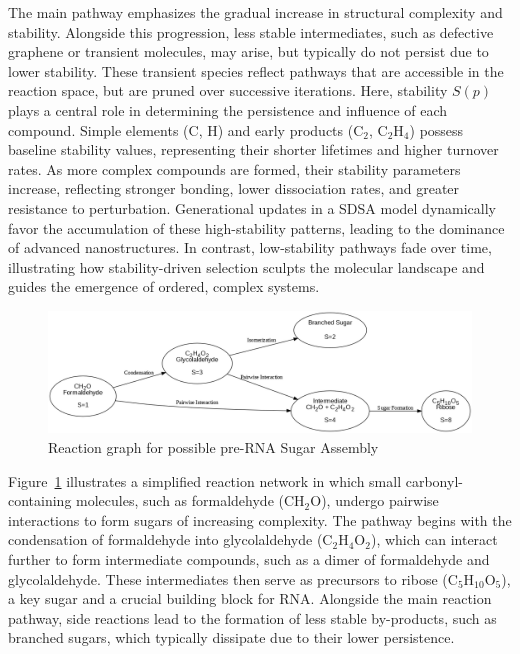 \documentclass[preprint,12pt]{elsarticle}
\begin{document}
The main pathway emphasizes the gradual increase in structural complexity and stability. Alongside this progression, less stable intermediates, such as defective graphene or transient molecules, may arise, but typically do not persist due to lower stability. These transient species reflect pathways that are accessible in the reaction space, but are pruned over successive iterations. Here, stability \( S(p) \) plays a central role in determining the persistence and influence of each compound. Simple elements (\( \text{C} \), \( \text{H} \)) and early products (\( \text{C}_2 \), \( \text{C}_2\text{H}_4 \)) possess baseline stability values, representing their shorter lifetimes and higher turnover rates. As more complex compounds are formed, their stability parameters increase, reflecting stronger bonding, lower dissociation rates, and greater resistance to perturbation. Generational updates in a SDSA model dynamically favor the accumulation of these high-stability patterns, leading to the dominance of advanced nanostructures. In contrast, low-stability pathways fade over time, illustrating how stability-driven selection sculpts the molecular landscape and guides the emergence of ordered, complex systems.


\begin{figure}[h]
    \centering
    \includegraphics[width=1\textwidth,height=0.4\textwidth]{figure_8.png}
    \caption{Reaction graph for possible pre-RNA Sugar Assembly}
    \label{fig:figure_8}
\end{figure}

Figure~\ref{fig:figure_8} illustrates a simplified reaction network in which small carbonyl-containing molecules, such as formaldehyde (CH$_2$O), undergo pairwise interactions to form sugars of increasing complexity. The pathway begins with the condensation of formaldehyde into glycolaldehyde (C$_2$H$_4$O$_2$), which can interact further to form intermediate compounds, such as a dimer of formaldehyde and glycolaldehyde. These intermediates then serve as precursors to ribose (C$_5$H$_{10}$O$_5$), a key sugar and a crucial building block for RNA. Alongside the main reaction pathway, side reactions lead to the formation of less stable by-products, such as branched sugars, which typically dissipate due to their lower persistence.
\end{document}
